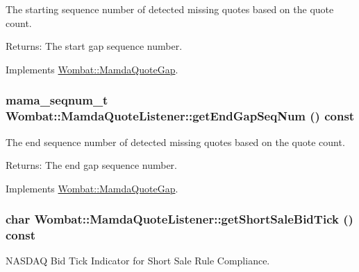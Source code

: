 The starting sequence number of detected missing quotes based on the quote count. 

\begin{Desc}
\item[Returns:]The start gap sequence number. \end{Desc}


Implements \hyperlink{classWombat_1_1MamdaQuoteGap_f87125caab3a18c6dde0b5dc5e13f35a}{Wombat::Mamda\-Quote\-Gap}.\hypertarget{classWombat_1_1MamdaQuoteListener_bc314f778476b46c392f6a775c3a9d61}{
\subsubsection[getEndGapSeqNum]{\setlength{\rightskip}{0pt plus 5cm}mama\_\-seqnum\_\-t Wombat::Mamda\-Quote\-Listener::get\-End\-Gap\-Seq\-Num () const}}
\label{classWombat_1_1MamdaQuoteListener_bc314f778476b46c392f6a775c3a9d61}


The end sequence number of detected missing quotes based on the quote count. 

\begin{Desc}
\item[Returns:]The end gap sequence number. \end{Desc}


Implements \hyperlink{classWombat_1_1MamdaQuoteGap_167d4cb258854b3665a5a7624824103d}{Wombat::Mamda\-Quote\-Gap}.\hypertarget{classWombat_1_1MamdaQuoteListener_3f4102824e3e3d8a0032c0978067387f}{
\subsubsection[getShortSaleBidTick]{\setlength{\rightskip}{0pt plus 5cm}char Wombat::Mamda\-Quote\-Listener::get\-Short\-Sale\-Bid\-Tick () const}}
\label{classWombat_1_1MamdaQuoteListener_3f4102824e3e3d8a0032c0978067387f}


NASDAQ Bid Tick Indicator for Short Sale Rule Compliance. 

